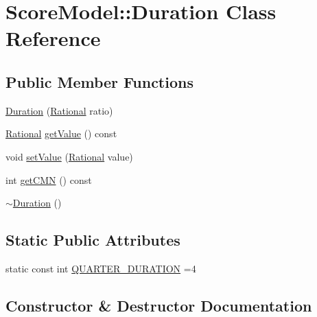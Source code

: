 \hypertarget{classScoreModel_1_1Duration}{}\section{Score\+Model\+::Duration Class Reference}
\label{classScoreModel_1_1Duration}
\subsection*{Public Member Functions}
\begin{DoxyCompactItemize}
\item 
\mbox{\hyperlink{classScoreModel_1_1Duration_aa2e8ee49de085039d079faf1351a21b3}{Duration}} (\mbox{\hyperlink{classRational}{Rational}} ratio)
\item 
\mbox{\hyperlink{classRational}{Rational}} \mbox{\hyperlink{classScoreModel_1_1Duration_a8fce14c5c61ab8575d9fbc77025fb1cd}{get\+Value}} () const
\item 
void \mbox{\hyperlink{classScoreModel_1_1Duration_a43dc9acb53b931de80f75fd929d9fd4d}{set\+Value}} (\mbox{\hyperlink{classRational}{Rational}} value)
\item 
int \mbox{\hyperlink{classScoreModel_1_1Duration_a3c1433fd0a073dc75d529f18257c1557}{get\+C\+MN}} () const
\item 
\mbox{\hyperlink{classScoreModel_1_1Duration_a3f30d745dfae4286f5fb9dfdf0542d64}{$\sim$\+Duration}} ()
\end{DoxyCompactItemize}
\subsection*{Static Public Attributes}
\begin{DoxyCompactItemize}
\item 
static const int \mbox{\hyperlink{classScoreModel_1_1Duration_ae897ce15da38ac887ddba0cf769c5ad7}{Q\+U\+A\+R\+T\+E\+R\+\_\+\+D\+U\+R\+A\+T\+I\+ON}} =4
\end{DoxyCompactItemize}


\subsection{Constructor \& Destructor Documentation}
\mbox{\label{classScoreModel_1_1Duration_aa2e8ee49de085039d079faf1351a21b3}} 
